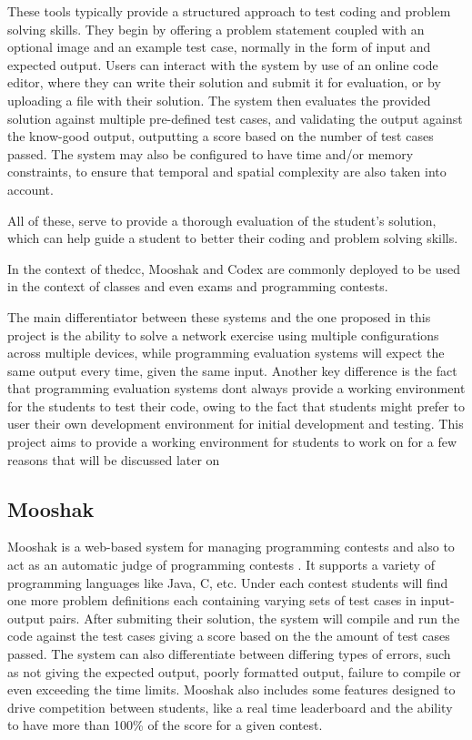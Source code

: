 These tools typically provide a structured approach to test coding and problem solving skills. They begin by offering a
problem statement coupled with an optional image and an example test case, normally in the form of input and expected output.
Users can interact with the system by use of an online code editor, where they can write their solution and submit it for
evaluation, or by uploading a file with their solution. The system then evaluates the provided solution against multiple
pre-defined test cases, and validating the output against the know-good output, outputting a score based on the number of 
test cases passed. The system may also be configured to have time and/or memory constraints, to ensure that temporal and
spatial complexity are also taken into account.

All of these, serve to provide a thorough evaluation of the student's solution, which can help guide a student to better
their coding and problem solving skills.

In the context of the\ac{dcc}, Mooshak and Codex are commonly deployed to be used in the context of classes and 
even exams and programming contests.

The main differentiator between these systems and the one proposed in this project is the ability to solve a network 
exercise using multiple configurations across multiple devices, while programming evaluation systems will expect
the same output every time, given the same input.
Another key difference is the fact that programming evaluation systems dont always provide a working environment for the 
students to test their code, owing to the fact that students might prefer to user their own development environment for 
initial development and testing. This project aims to provide a working environment for students to work on for a few
reasons that will be discussed later on 

\subsection{Mooshak}
Mooshak is a web-based system for managing programming contests and also to act as an automatic judge of programming 
contests \cite{Leal2003567}. It supports a variety of programming languages like Java, C, etc. Under each contest students will find one more 
problem definitions each containing varying sets of test cases in input-output pairs. After submiting their solution, 
the system will compile and run the code against the test cases giving a score based on the the amount of test cases passed.
The system can also differentiate between differing types of errors, such as not giving the expected output, poorly 
formatted output, failure to compile or even exceeding the time limits.
Mooshak also includes some features designed to drive competition between students, like a real time leaderboard and
the ability to have more than 100\% of the score for a given contest.

